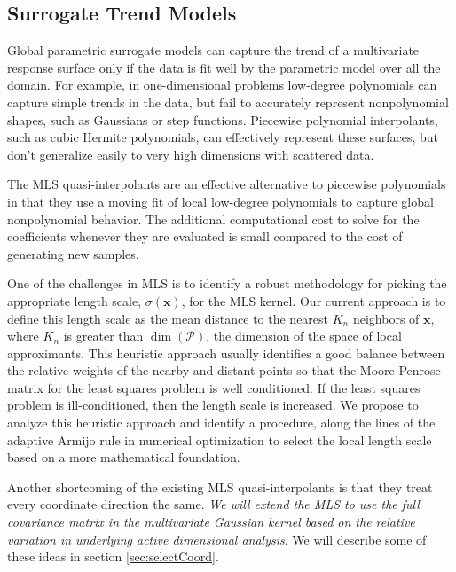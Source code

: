 \documentclass[11pt]{NSFamsart}
\newcommand{\bx}{{\boldsymbol{x}}}
\newcommand{\calp}{{\mathcal{P}}}
\begin{document}
\subsection{Surrogate Trend Models} \label{sec:ourtrend}
Global parametric surrogate models can capture the trend of a multivariate response surface only if the data is fit well by the parametric model over all the domain.  For example, in one-dimensional problems low-degree polynomials can capture simple trends in the data, but fail to accurately represent nonpolynomial shapes, such as Gaussians  or step functions.  Piecewise polynomial interpolants, such as cubic Hermite polynomials, can effectively represent these surfaces, but don't generalize easily to very high dimensions with scattered  data.  

The MLS quasi-interpolants are an effective alternative to piecewise polynomials in that they use a moving fit of local low-degree polynomials to capture global nonpolynomial behavior.  The additional computational cost to solve for the coefficients whenever they are evaluated is small compared to the cost of generating new samples.  

One of the challenges in MLS is to identify a robust methodology for picking the appropriate  length scale, $\sigma(\bx)$, for the MLS kernel.  Our current approach is to define this length scale as the mean distance to the nearest $K_n$ neighbors of $\bx$, where $K_n$ is greater than $\dim(\calp)$, the dimension of the space of local approximants.
This heuristic approach usually identifies a good balance between the relative weights of the nearby and distant points so that the Moore Penrose matrix for the least squares problem is well conditioned.  If the least squares problem is ill-conditioned, then the length scale is increased.  We propose to analyze this heuristic approach and identify a procedure, along the lines of the adaptive Armijo rule in numerical optimization \cite{kelley1999iterative} to select the local length scale based on a more mathematical foundation.

Another shortcoming of the existing MLS quasi-interpolants is that they treat every coordinate direction the same.  
\emph{We will extend the MLS to use the full covariance matrix in the multivariate Gaussian kernel based on the relative variation in underlying active dimensional analysis}. We will  describe some of these ideas in section \ref{sec:selectCoord}.  
\end{document}
